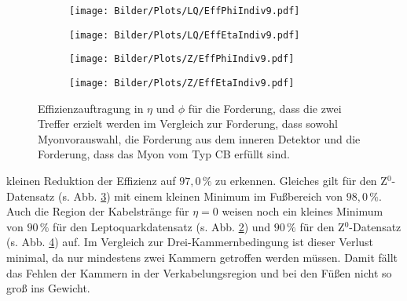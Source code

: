 \begin{figure}
  \begin{subfigure}[t]{0.55\textwidth}
  \texttt{[image: Bilder/Plots/LQ/EffPhiIndiv9.pdf]}
  \label{EffPhiIndiv9LQ}
  \end{subfigure}
\begin{subfigure}[t]{0.55\textwidth}
 \texttt{[image: Bilder/Plots/LQ/EffEtaIndiv9.pdf]}
  \label{EffEtaIndiv9LQ}
\end{subfigure}
\begin{subfigure}[t]{0.55\textwidth}
  \texttt{[image: Bilder/Plots/Z/EffPhiIndiv9.pdf]}
  \label{EffPhiIndiv9Z}
  \end{subfigure}
  \begin{subfigure}[t]{0.55\textwidth}
  \texttt{[image: Bilder/Plots/Z/EffEtaIndiv9.pdf]}
  \label{EffEtaIndiv9Z}
  \end{subfigure}
\caption{Effizienzauftragung in $\eta$ und $\phi$ für die Forderung, dass die zwei Treffer erzielt werden im Vergleich zur Forderung, dass sowohl Myonvorauswahl, die Forderung aus dem inneren Detektor und die Forderung, dass das Myon vom Typ CB erfüllt sind.}
\label{EffIndiv9}
\end{figure}
kleinen Reduktion der Effizienz auf $97,0\,\%$ zu erkennen. Gleiches gilt für den Z$^0$-Datensatz (s. Abb. \ref{EffPhiIndiv9Z}) mit einem kleinen Minimum im Fußbereich von $98,0\,\%$.\\
Auch die Region der Kabelstränge für $\eta=0$ weisen noch ein kleines Minimum von $90\,\%$ für den Leptoquarkdatensatz (s. Abb. \ref{EffEtaIndiv9LQ}) und $90\,\%$ für den Z$^0$-Datensatz (s. Abb. \ref{EffEtaIndiv9Z}) auf. Im Vergleich zur Drei-Kammernbedingung ist dieser Verlust minimal, da nur mindestens zwei Kammern getroffen werden müssen. Damit fällt das Fehlen der Kammern in der Verkabelungsregion und bei den Füßen nicht so groß ins Gewicht.\\
%
%
%
